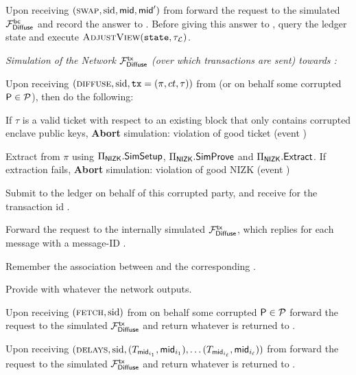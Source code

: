 \begin{simulatorbox}
\begin{cccItemize}[nosep]
        \item Upon receiving $(\textsc{swap}, \mathrm{sid}, \mathsf{mid}, \mathsf{mid}')$ from \adv forward the request to the simulated $\mathcal{F}_{\mathsf{Diffuse}}^{\mathsf{bc}}$ and record the answer to \adv.
        Before giving this answer to \adv, query the ledger state \state and execute $\textsc{AdjustView}(\mathtt{state}, \tau_\mathcal{L})$.
    \end{cccItemize}

    \medskip\emph{Simulation of the Network $\mathcal{F}_{\mathsf{Diffuse}}^{\mathsf{tx}}$ (over which transactions are sent) towards \adv:}
    \begin{cccItemize}[nosep]
        \item Upon receiving $(\textsc{diffuse}, \mathrm{sid}, \mathtt{tx} = (\pi, ct, \tau))$ from \adv (or on behalf some corrupted $\mathsf{P} \in \mathcal{P}$), then do the following:
        \begin{cccEnum}[nosep]
            \item If $\tau$ is a valid ticket with respect to an existing block that only contains corrupted enclave public keys, \textbf{Abort} simulation: violation of good ticket (event \badTicket)
            \item Extract \tx from $\pi$ using $\Pi_{\mathsf{NIZK}}.\mathsf{SimSetup}$, $\Pi_{\mathsf{NIZK}}.\mathsf{SimProve}$ and $\Pi_{\mathsf{NIZK}}.\mathsf{Extract}$. If extraction fails, \textbf{Abort} simulation: violation of good NIZK (event \badNIZK)
            \item Submit \tx to the ledger on behalf of this corrupted party, and receive for the transaction id \txid.
            \item Forward the request to the internally simulated $\mathcal{F}_{\mathsf{Diffuse}}^{\mathsf{tx}}$, which replies for each message with a message-ID \msgid.
            \item Remember the association between \msgid and the corresponding \txid.
            \item Provide \adv with whatever the network outputs.
        \end{cccEnum}

        \item Upon receiving $(\textsc{fetch}, \mathrm{sid})$ from \adv on behalf some corrupted $\mathsf{P} \in \mathcal{P}$ forward the request to the simulated $\mathcal{F}_{\mathsf{Diffuse}}^{\mathsf{tx}}$ and return whatever is returned to \adv.

        \item Upon receiving $(\textsc{delays}, \mathrm{sid}, (T_{\mathsf{mid}_{i_1}}, \mathsf{mid}_{i_1}), \ldots (T_{\mathsf{mid}_{i_\ell}}, \mathsf{mid}_{i_\ell}))$ from \adv forward the request to the simulated $\mathcal{F}_{\mathsf{Diffuse}}^{\mathsf{tx}}$ and return whatever is returned to \adv.


\end{cccItemize}
\end{simulatorbox}
